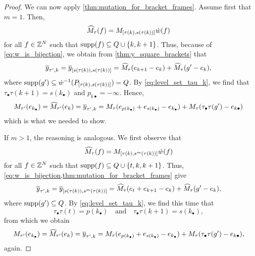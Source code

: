 \begin{proof}
	We can now apply \cref{thm:mutation_for_bracket_frames}. Assume first that $m = 1$.
	Then,
	\begin{equation*}
		\widehat{M}_\tau(f) = M_{[\tau(k), s(\tau(k))]}\dot{w}(f)
	\end{equation*}
	for all $f \in \mathbb{Z}^N$ such that $\operatorname{supp}(f) \subseteq Q \cup \{k, k+1\}$. Thus, because of \cref{eq:w_is_bijection}, we obtain from \cref{thm:y_square_brackets} that
	\begin{equation*}
		\overline{y}_{\tau', k} = \overline{y}_{[s(\tau(k)), s(\tau(k))]} = \widehat{M}_\tau(e_{k+1} - e_k) + \widehat{M}_{\tau}(g' - e_k),
	\end{equation*}
	where $\operatorname{supp}(g') \subseteq \dot{w}^{-1}(P_{[\tau(k), s(\tau(k))]}) = Q$. By
	\cref{eq:level_set_tau_k}, we find that $\tau_\bullet\tau(k+1) = s(k_\bullet)$ and
	$p_{k\bullet} = -\infty$. Hence,
	\begin{equation*}
		M_{\tau'}(e_{k_\bullet}) = \widehat{M}_{\tau'}(e_k) = \overline{y}_{\tau', k} = M_\tau(e_{p(k_\bullet)} + e_{s(k_\bullet)} - e_{k_\bullet}) + M_\tau(\tau_\bullet \tau(g') - e_{k\bullet})
	\end{equation*}
	which is what we needed to show.

	If $m > 1$, the reasoning is analogous. We first observe that
	\begin{equation*}
		\widehat{M}_\tau(f) = M_{[\tau(k), s^m(\tau(k))]}\dot{w}(f)
	\end{equation*}
	for all $f \in \mathbb{Z}^N$ such that $\operatorname{supp}(f) \subseteq Q \cup \{t, k , k+1\}$. Thus, \cref{eq:w_is_bijection,thm:mutation_for_bracket_frames} give
	\begin{align*}
		\overline{y}_{\tau', k} = \overline{y}_{[s(\tau(k)), s^m(\tau(k))]} = \widehat{M}_\tau(e_t + e_{k+1} - e_k) + \widehat{M}_\tau(g' - e_k),
	\end{align*}
	where $\operatorname{supp}(g') \subseteq Q$. By \cref{eq:level_set_tau_k}, we find this time that
	\begin{equation*}
		\tau_\bullet\tau(t) = p(k_\bullet) \quad \text{and} \quad \tau_\bullet\tau(k+1) = s(k_\bullet),
	\end{equation*}
	from which we obtain
	\begin{equation*}
		M_{\tau'}(e_{k_\bullet}) = \widehat{M}_{\tau'}(e_k) = \overline{y}_{\tau', k} = M_\tau(e_{p(k_\bullet)} + e_{s(k_\bullet)} - e_{k_\bullet}) + M_\tau(\tau_\bullet \tau(g') - e_{k\bullet}),
	\end{equation*}
	again.


\end{proof}
